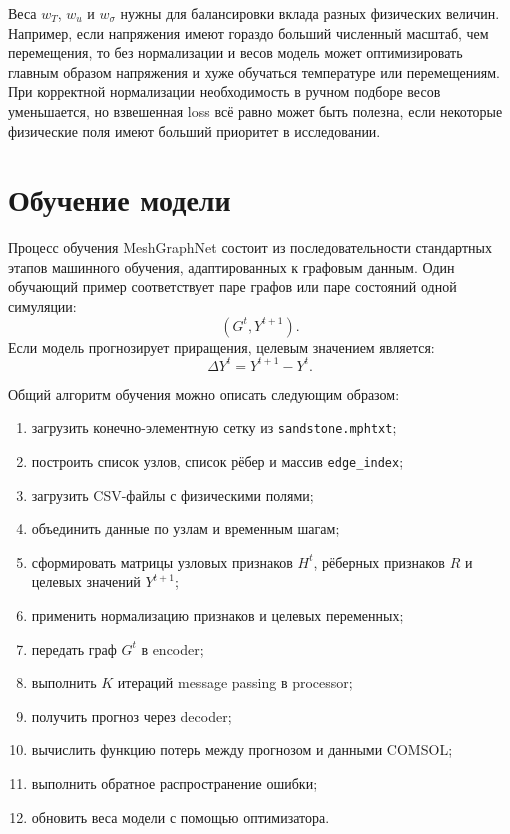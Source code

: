Веса $w_T$, $w_u$ и $w_{\sigma}$ нужны для балансировки вклада разных физических величин. Например, если напряжения имеют гораздо больший численный масштаб, чем перемещения, то без нормализации и весов модель может оптимизировать главным образом напряжения и хуже обучаться температуре или перемещениям. При корректной нормализации необходимость в ручном подборе весов уменьшается, но взвешенная loss всё равно может быть полезна, если некоторые физические поля имеют больший приоритет в исследовании.

\section{Обучение модели}

Процесс обучения MeshGraphNet состоит из последовательности стандартных этапов машинного обучения, адаптированных к графовым данным. Один обучающий пример соответствует паре графов или паре состояний одной симуляции:
\begin{equation}
    (G^t,Y^{t+1}).
\end{equation}
Если модель прогнозирует приращения, целевым значением является:
\begin{equation}
    \Delta Y^t=Y^{t+1}-Y^t.
\end{equation}

Общий алгоритм обучения можно описать следующим образом:
\begin{enumerate}
    \item загрузить конечно-элементную сетку из \texttt{sandstone.mphtxt};
    \item построить список узлов, список рёбер и массив \texttt{edge\_index};
    \item загрузить CSV-файлы с физическими полями;
    \item объединить данные по узлам и временным шагам;
    \item сформировать матрицы узловых признаков $H^t$, рёберных признаков $R$ и целевых значений $Y^{t+1}$;
    \item применить нормализацию признаков и целевых переменных;
    \item передать граф $G^t$ в encoder;
    \item выполнить $K$ итераций message passing в processor;
    \item получить прогноз через decoder;
    \item вычислить функцию потерь между прогнозом и данными COMSOL;
    \item выполнить обратное распространение ошибки;
    \item обновить веса модели с помощью оптимизатора.
\end{enumerate}

